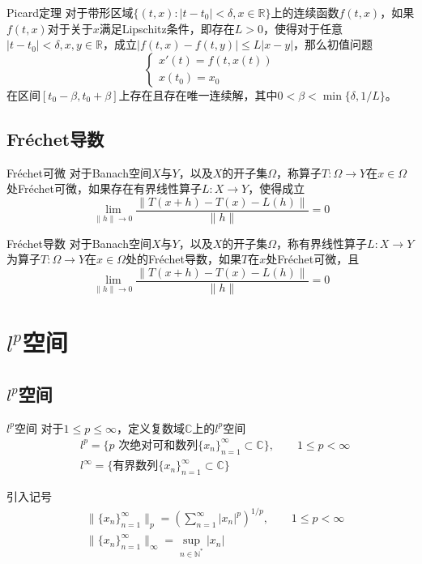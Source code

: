 \documentclass[lang = cn, scheme = chinese, thmcnt = section]{elegantbook}
\newcommand{\N}{\mathbb{N}}            %
\newcommand{\R}{\mathbb{R}}            %
\newcommand{\C}{\mathbb{C}}  		   %
\newcommand{\sub}{\subset}             %
\begin{document}
\begin{theorem}{Picard定理}
	对于带形区域$\{ (t,x):|t-t_0|<\delta,x\in\R \}$上的连续函数$f(t,x)$，如果$f(t,x)$对于关于$x$满足Lipschitz条件，即存在$L>0$，使得对于任意$|t-t_0|<\delta,x,y\in\R$，成立$|f(t,x)-f(t,y)|\le L|x-y|$，那么初值问题
	$$
	\begin{cases}x'(t)=f(t,x(t))\\x(t_0)=x_0\end{cases}
	$$
	在区间$[t_0-\beta,t_0+\beta]$上存在且存在唯一连续解，其中$0<\beta<\min\{\delta,1/L\}$。
\end{theorem}

\subsection{Fréchet导数}

\begin{definition}{Fréchet可微}
	对于Banach空间$X$与$Y$，以及$X$的开子集$\Omega$，称算子$T:\Omega\to Y$在$x\in\Omega$处Fréchet可微，如果存在有界线性算子$L:X\to Y$，使得成立
	$$
	\lim_{\|h\|\to 0}\frac{\| T(x+h)-T(x)-L(h) \|}{\|h\|}=0
	$$
\end{definition}

\begin{definition}{Fréchet导数}
	对于Banach空间$X$与$Y$，以及$X$的开子集$\Omega$，称有界线性算子$L:X\to Y$为算子$T:\Omega\to Y$在$x\in\Omega$处的Fréchet导数，如果$T$在$x$处Fréchet可微，且
	$$
	\lim_{\|h\|\to 0}\frac{\| T(x+h)-T(x)-L(h) \|}{\|h\|}=0
	$$
\end{definition}

\section{$l^p$空间}

\subsection{$l^p$空间}

\begin{definition}{$l^p$空间}
	对于$1\le p \le \infty$，定义复数域$\mathbb{C}$上的$l^p$空间
	\nonumber\begin{align}
		&l^p=\{p\text{ 次绝对可和数列}\{x_n\}_{n=1}^{\infty}\sub\C\},\qquad 1\le  p<\infty\\
		&l^\infty=\{\text{有界数列}\{x_n\}_{n=1}^{\infty}\sub\C\}
	\end{align}
	
	引入记号
	\nonumber\begin{align}
		&\|\{x_n\}_{n=1}^{\infty}\|_p=\left(\sum_{n=1}^{\infty}|x_n|^p\right)^{1/p},\qquad 1\le p<\infty\\
		&\|\{x_n\}_{n=1}^{\infty}\|_\infty=\sup_{n\in\N^*}|x_n|
	\end{align}
\end{definition}
\end{document}
